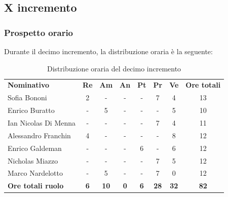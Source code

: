 \documentclass[../piano-di-progetto.tex]{subfiles}
\begin{document}
  \subsection{X incremento}

  \subsubsection{Prospetto orario}
 Durante il decimo incremento, la distribuzione oraria è la seguente:
  \begin{table}[H]
    \centering
    \begin{tabular}{lccccccc}
    \rowcolor{lightgray}
    \textbf{Nominativo}       & \textbf{Re} & \textbf{Am} & \textbf{An} & \textbf{Pt} & \textbf{Pr} & \textbf{Ve} & \textbf{Ore totali} \\

Sofia Bononi              & 2          & -           & -          & -          & 7           & 4           & 13          \\
Enrico Buratto            & -          & 5           & -          & -          & -           & 5           & 10          \\
Ian Nicolas Di Menna      & -          & -           & -          & -          & 7           & 4           & 11          \\
Alessandro Franchin       & 4          & -           & -          & -          & -           & 8           & 12          \\
Enrico Galdeman           & -          & -           & -          & 6          & -           & 6           & 12          \\
Nicholas Miazzo           & -          & -           & -          & -          & 7           & 5           & 12          \\
Marco Nardelotto          & -          & 5           & -          & -          & 7           & 0           & 12          \\
\textbf{Ore totali ruolo} & \textbf{6} & \textbf{10} & \textbf{0} & \textbf{6} & \textbf{28} & \textbf{32} & \textbf{82}

    \end{tabular}
    \caption{Distribuzione oraria del decimo incremento}
  \end{table}
\end{document}
